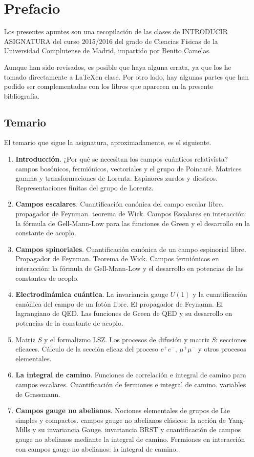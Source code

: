 \documentclass[{../cc.tex}]{subfiles}
\begin{document}
\chapter{Prefacio}


Los presentes apuntes son una recopilación de las clases de INTRODUCIR ASIGNATURA del curso 2015/2016 del grado de Ciencias Físicas de la Universidad Complutense de Madrid, impartido por Benito Camelas.

Aunque han sido revisados, es posible que haya alguna errata, ya que los he tomado directamente a \LaTeX en clase. Por otro lado, hay algunas partes que han podido ser complementadas con los libros que aparecen en la presente bibliografía.

\section*{Temario}

El temario que sigue la asignatura, aproximadamente, es el siguiente.

\begin{enumerate}
	\item \textbf{Introducción}. ¿Por qué se necesitan los campos cuánticos relativista? campos bosónicos, fermiónicos, vectoriales y el grupo de Poincaré. Matrices gamma y transformaciones de Lorentz. Espinores zurdos y diestros. Representaciones finitas del grupo de Lorentz.
	\item \textbf{Campos escalares}. Cuantificación canónica del campo escalar libre. propagador de Feynman. teorema de Wick. Campos Escalares en interacción: la fórmula de Gell-Mann-Low para las funciones de Green y el desarrollo en la constante de acoplo.
	\item \textbf{Campos spinoriales}. Cuantificación canónica de un campo espinorial libre. Propagador de Feynman. Teorema de Wick. Campos fermiónicos en interacción: la fórmula de Gell-Mann-Low y el desarrollo en potencias de las constantes de acoplo.
	\item \textbf{Electrodinámica cuántica}. La invariancia gauge $U(1)$ y la cuantificación canónica del campo de un fotón libre. El propagador de Feynamn. El lagrangiano de QED. Las funciones de Green de QED y su desarrollo en potencias de la constante de acoplo.
	\item Matriz $S$ y el formalizmo LSZ. Los procesos de difusión y matriz $S$: secciones eficaces. Cálculo de la sección eficaz del proceso $e^+ e^-$, $\mu^+ \mu^-$ y otros procesos elementales.
	\item \textbf{La integral de camino}. Funciones de correlación e integral de camino para campos escalares. Cuantificación de fermiones e integral de camino. variables de Grassmann.
	\item \textbf{Campos gauge no abelianos}. Nociones elementales de grupos de Lie simples y compactos. campos gauge no abelianos clásicos: la acción de Yang-Mills y su invariancia Gauge. invariancia BRST y cuantificación de campos gauge no abelianos mediante la integral de camino. Fermiones en interacción con campos gauge no abelianos: la integral de camino.
\end{enumerate}
\end{document}
